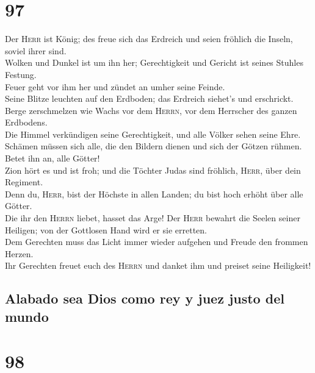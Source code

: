 \hypertarget{section-96}{%
\section{97}\label{section-96}}

 Der \textsc{Herr} ist König; des freue sich das Erdreich
und seien fröhlich die Inseln, soviel ihrer sind.\\
 Wolken und Dunkel ist um ihn her; Gerechtigkeit und
Gericht ist seines Stuhles Festung.\\
 Feuer geht vor ihm her und zündet an umher seine
Feinde.\\
 Seine Blitze leuchten auf den Erdboden; das Erdreich
siehet's und erschrickt.\\
 Berge zerschmelzen wie Wachs vor dem \textsc{Herrn}, vor
dem Herrscher des ganzen Erdbodens.\\
 Die Himmel verkündigen seine Gerechtigkeit, und alle
Völker sehen seine Ehre.\\
 Schämen müssen sich alle, die den Bildern dienen und sich
der Götzen rühmen. Betet ihn an, alle Götter!\\
 Zion hört es und ist froh; und die Töchter Judas sind
fröhlich, \textsc{Herr}, über dein Regiment.\\
 Denn du, \textsc{Herr}, bist der Höchste in allen Landen;
du bist hoch erhöht über alle Götter.\\
 Die ihr den \textsc{Herrn} liebet, hasset das Arge! Der
\textsc{Herr} bewahrt die Seelen seiner Heiligen; von der Gottlosen Hand
wird er sie erretten.\\
 Dem Gerechten muss das Licht immer wieder aufgehen und
Freude den frommen Herzen.\\
 Ihr Gerechten freuet euch des \textsc{Herrn} und danket
ihm und preiset seine Heiligkeit!

\hypertarget{alabado-sea-dios-como-rey-y-juez-justo-del-mundo}{%
\subsection{Alabado sea Dios como rey y juez justo del
mundo}\label{alabado-sea-dios-como-rey-y-juez-justo-del-mundo}}

\hypertarget{section-97}{%
\section{98}\label{section-97}}

